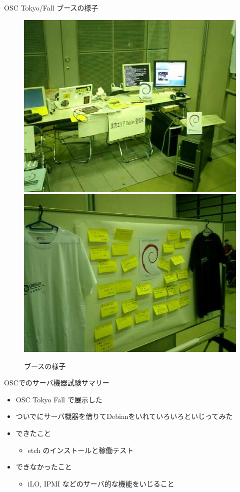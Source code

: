 \documentclass[cjk,dvipdfmx,12pt]{beamer}
\begin{document}
\begin{frame}{OSC Tokyo/Fall ブースの様子}
  \begin{figure}[H]
 \begin{center}
  \includegraphics[width=0.45\hsize]{image200710/booth.jpg}
  \includegraphics[width=0.45\hsize]{image200710/whiteboard.jpg}
 \end{center}
 \caption{ブースの様子}
 \label{fig:oscfalldebbooth2}
 \end{figure}
\end{frame}

\begin{frame}{OSCでのサーバ機器試験サマリー}
 \begin{itemize}
  \item OSC Tokyo Fall で展示した
  \item ついでにサーバ機器を借りてDebianをいれていろいろといじってみた
  \item できたこと
	\begin{itemize}
	 \item etch のインストールと稼働テスト
	\end{itemize}
  \item できなかったこと
	\begin{itemize}
	 \item iLO, IPMI などのサーバ的な機能をいじること
	\end{itemize}
 \end{itemize}
\end{frame}
\end{document}

